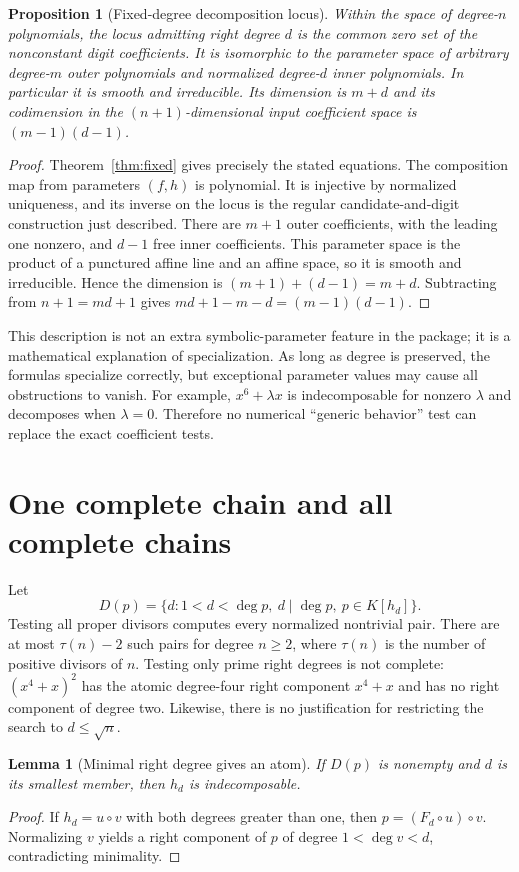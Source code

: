 \documentclass[11pt,a4paper]{article}
\numberwithin{equation}{section}
\newtheorem{lemma}[theorem]{Lemma}
\newtheorem{proposition}[theorem]{Proposition}
\theoremstyle{definition}
\theoremstyle{remark}
\begin{document}
\begin{proposition}[Fixed-degree decomposition locus]
\label{prop:locus}
Within the space of degree-$n$ polynomials, the locus admitting right degree
$d$ is the common zero set of the nonconstant digit coefficients. It is
isomorphic to the parameter space of arbitrary degree-$m$ outer polynomials
and normalized degree-$d$ inner polynomials. In particular it is smooth and irreducible. Its dimension is $m+d$ and its
codimension in the $(n+1)$-dimensional input coefficient space is
$(m-1)(d-1)$.
\end{proposition}
\begin{proof}
Theorem~\ref{thm:fixed} gives precisely the stated equations. The composition
map from parameters $(f,h)$ is polynomial. It is injective by normalized
uniqueness, and its inverse on the locus is the regular candidate-and-digit
construction just described. There are $m+1$ outer coefficients, with the
leading one nonzero, and $d-1$ free inner coefficients. This parameter space is the product of a punctured affine line and an affine space, so it is smooth and irreducible. Hence the dimension
is $(m+1)+(d-1)=m+d$. Subtracting from $n+1=md+1$ gives
$md+1-m-d=(m-1)(d-1)$.
\end{proof}

This description is not an extra symbolic-parameter feature in the package;
it is a mathematical explanation of specialization. As long as degree is
preserved, the formulas specialize correctly, but exceptional parameter
values may cause all obstructions to vanish. For example, $x^6+\lambda x$
is indecomposable for nonzero $\lambda$ and decomposes when $\lambda=0$.
Therefore no numerical ``generic behavior'' test can replace the exact
coefficient tests.

\section{One complete chain and all complete chains}
\label{sec:chains}
Let
\[
 D(p)=\{d:1<d<\deg p,\ d\mid\deg p,\
                   p\in K[h_d]\}.
\]
Testing all proper divisors computes every normalized nontrivial pair. There
are at most $\tau(n)-2$ such pairs for degree $n\ge2$, where $\tau(n)$ is the
number of positive divisors of $n$. Testing only prime right degrees is not
complete: $(x^4+x)^2$ has the atomic degree-four right component $x^4+x$ and
has no right component of degree two. Likewise, there is no justification for
restricting the search to $d\le\sqrt n$.

\begin{lemma}[Minimal right degree gives an atom]
\label{lem:minimal}
If $D(p)$ is nonempty and $d$ is its smallest member, then $h_d$ is
indecomposable.
\end{lemma}
\begin{proof}
If $h_d=u\circ v$ with both degrees greater than one, then
$p=(F_d\circ u)\circ v$. Normalizing $v$ yields a right component of $p$ of
degree $1<\deg v<d$, contradicting minimality.
\end{proof}
\end{document}

